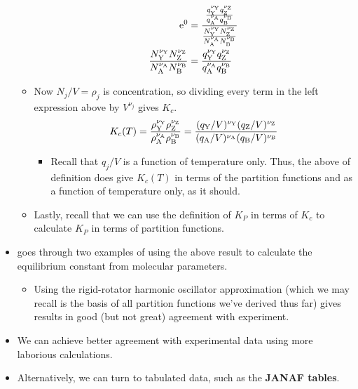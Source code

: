 \documentclass[../notes.tex]{subfiles}
\begin{document}
\begin{itemize}
\begin{itemize}
\begin{align*}
            \e[0] &= \frac{\frac{q_{\ce{Y}}^{\nu_{\ce{Y}}}q_{\ce{Z}}^{\nu_{\ce{Z}}}}{q_{\ce{A}}^{\nu_{\ce{A}}}q_{\ce{B}}^{\nu_{\ce{B}}}}}{\frac{N_{\ce{Y}}^{\nu_{\ce{Y}}}N_{\ce{Z}}^{\nu_{\ce{Z}}}}{N_{\ce{A}}^{\nu_{\ce{A}}}N_{\ce{B}}^{\nu_{\ce{B}}}}}\\
            \frac{N_{\ce{Y}}^{\nu_{\ce{Y}}}N_{\ce{Z}}^{\nu_{\ce{Z}}}}{N_{\ce{A}}^{\nu_{\ce{A}}}N_{\ce{B}}^{\nu_{\ce{B}}}} &= \frac{q_{\ce{Y}}^{\nu_{\ce{Y}}}q_{\ce{Z}}^{\nu_{\ce{Z}}}}{q_{\ce{A}}^{\nu_{\ce{A}}}q_{\ce{B}}^{\nu_{\ce{B}}}}
        \end{align*}
        \item Now $N_j/V=\rho_j$ is concentration, so dividing every term in the left expression above by $V^{\nu_j}$ gives $K_c$.
        \begin{equation*}
            K_c(T) = \frac{\rho_{\ce{Y}}^{\nu_{\ce{Y}}}\rho_{\ce{Z}}^{\nu_{\ce{Z}}}}{\rho_{\ce{A}}^{\nu_{\ce{A}}}\rho_{\ce{B}}^{\nu_{\ce{B}}}}
            = \frac{(q_{\ce{Y}}/V)^{\nu_{\ce{Y}}}(q_{\ce{Z}}/V)^{\nu_{\ce{Z}}}}{(q_{\ce{A}}/V)^{\nu_{\ce{A}}}(q_{\ce{B}}/V)^{\nu_{\ce{B}}}}
        \end{equation*}
        \begin{itemize}
            \item Recall that $q_j/V$ is a function of temperature only. Thus, the above of definition does give $K_c(T)$ in terms of the partition functions and as a function of temperature only, as it should.
        \end{itemize}
        \item Lastly, recall that we can use the definition of $K_P$ in terms of $K_c$ to calculate $K_P$ in terms of partition functions.
    \end{itemize}
    \item \textcite{bib:McQuarrieSimon} goes through two examples of using the above result to calculate the equilibrium constant from molecular parameters.
    \begin{itemize}
        \item Using the rigid-rotator harmonic oscillator approximation (which we may recall is the basis of all partition functions we've derived thus far) gives results in good (but not great) agreement with experiment.
    \end{itemize}
    \item {}We can achieve better agreement with experimental data using more laborious calculations.
    \item Alternatively, we can turn to tabulated data, such as the \textbf{JANAF tables}.

\end{itemize}
\end{document}
